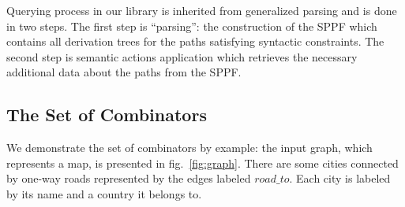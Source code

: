 
Querying process in our library is inherited from generalized parsing and is done in two steps.
The first step is ``parsing'': the construction of the SPPF which contains all derivation trees for the paths satisfying syntactic constraints.
The second step is semantic actions application which retrieves the necessary additional data about the paths from the SPPF.

\subsection{The Set of Combinators}

We demonstrate the set of combinators by example: the input graph, which represents a map, is presented in fig.~\ref{fig:graph}.
There are some cities connected by one-way roads represented by the edges labeled $road\_to$.
Each city is labeled by its name and a country it belongs to.

